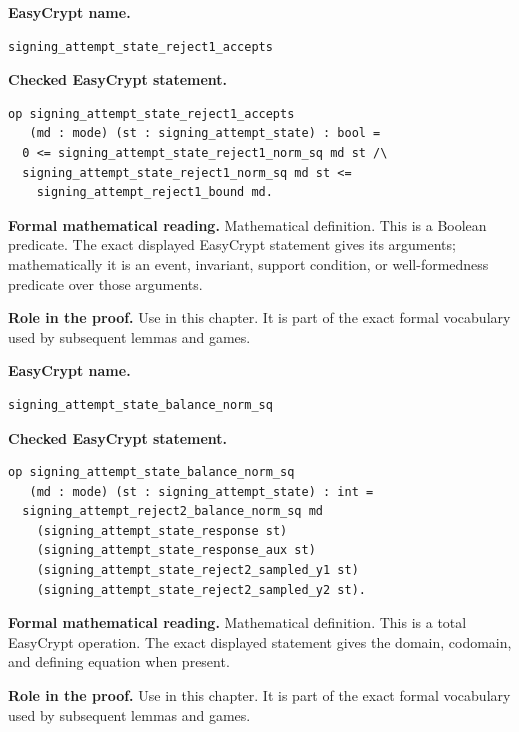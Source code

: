 \begin{formaldefinition}
\noindent\textbf{EasyCrypt name.}
\begin{lstlisting}[language=EasyCrypt,basicstyle=\ttfamily\scriptsize]
signing_attempt_state_reject1_accepts
\end{lstlisting}
\noindent\textbf{Checked EasyCrypt statement.}
\begin{lstlisting}[language=EasyCrypt,basicstyle=\ttfamily\scriptsize]
op signing_attempt_state_reject1_accepts
   (md : mode) (st : signing_attempt_state) : bool =
  0 <= signing_attempt_state_reject1_norm_sq md st /\
  signing_attempt_state_reject1_norm_sq md st <=
    signing_attempt_reject1_bound md.
\end{lstlisting}
\noindent\textbf{Formal mathematical reading.}
Mathematical definition. This is a Boolean predicate.  The exact displayed EasyCrypt statement gives its arguments; mathematically it is an event, invariant, support condition, or well-formedness predicate over those arguments.

\noindent\textbf{Role in the proof.}
Use in this chapter. It is part of the exact formal vocabulary used by subsequent lemmas and games.

\end{formaldefinition}

\begin{formaldefinition}
\noindent\textbf{EasyCrypt name.}
\begin{lstlisting}[language=EasyCrypt,basicstyle=\ttfamily\scriptsize]
signing_attempt_state_balance_norm_sq
\end{lstlisting}
\noindent\textbf{Checked EasyCrypt statement.}
\begin{lstlisting}[language=EasyCrypt,basicstyle=\ttfamily\scriptsize]
op signing_attempt_state_balance_norm_sq
   (md : mode) (st : signing_attempt_state) : int =
  signing_attempt_reject2_balance_norm_sq md
    (signing_attempt_state_response st)
    (signing_attempt_state_response_aux st)
    (signing_attempt_state_reject2_sampled_y1 st)
    (signing_attempt_state_reject2_sampled_y2 st).
\end{lstlisting}
\noindent\textbf{Formal mathematical reading.}
Mathematical definition. This is a total EasyCrypt operation.  The exact displayed statement gives the domain, codomain, and defining equation when present.

\noindent\textbf{Role in the proof.}
Use in this chapter. It is part of the exact formal vocabulary used by subsequent lemmas and games.

\end{formaldefinition}

